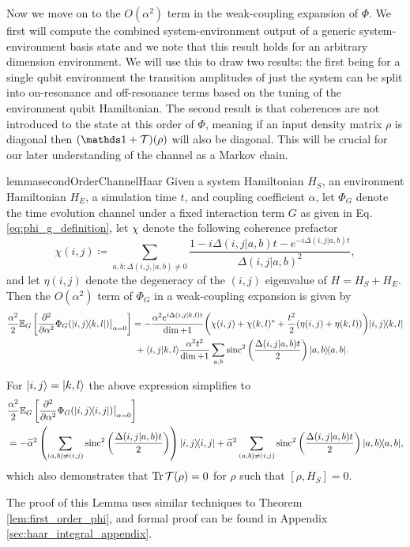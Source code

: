 Now we move on to the $O(\alpha^2)$ term in the weak-coupling expansion of $\Phi$. We first will compute the combined system-environment output of a generic system-environment basis state and we note that this result holds for an arbitrary dimension environment. We will use this to draw two results:  the first being for a single qubit environment the transition amplitudes of just the system can be split into on-resonance and off-resonance terms based on the tuning of the environment qubit Hamiltonian. The second result is that coherences are not introduced to the state at this order of $\Phi$, meaning if an input density matrix $\rho$ is diagonal then $(\identity + \mathcal{T})(\rho)$ will also be diagonal. This will be crucial for our later understanding of the channel as a Markov chain.
\begin{restatable}{lemma}{secondOrderChannelHaar} \label{lem:big_one}
    Given a system Hamiltonian $H_{S}$, an environment Hamiltonian $H_{E}$, a simulation time $t$, and coupling coefficient $\alpha$, let $\Phi_G$ denote the time evolution channel under a fixed interaction term $G$ as given in Eq. \eqref{eq:phi_g_definition}, let $\chi$ denote the following coherence prefactor
$$ \chi(i,j) \coloneqq \sum_{a,b: \Delta(i,j,|a,b) \neq 0} \frac{1 - i \Delta(i,j|a,b)t - e^{-i \Delta(i,j|a,b) t}}{\Delta(i,j|a,b)^2}, $$
and let $\eta(i,j)$ denote the degeneracy of the $(i,j)$ eigenvalue of $H = H_S + H_E$. Then the $O(\alpha^2)$ term of $\Phi_G$ in a weak-coupling expansion is given by
 \begin{align}
 \frac{\alpha^2}{2} \mathbb{E}_G \left[ \frac{\partial^2}{\partial \alpha^2} \Phi_G(| i,j\rangle\! \langle k,l|) \big|_{\alpha = 0} \right] &= -\frac{\alpha^2  e^{i \Delta(i,j|k,l) t}}{\dim + 1} \bigg(\chi(i,j) + \chi(k,l)^*  + \frac{t^2}{2}(\eta(i,j) + \eta(k,l)) \bigg) | i,j\rangle\! \langle k,l| \nonumber \\
    &~ + \langle i,j|k,l\rangle  \frac{\alpha^2 t^2}{\dim+1} \sum_{a,b} \operatorname{sinc}^2 \left( \frac{\Delta(i,j|a,b)t}{2} \right) | a,b\rangle\! \langle a,b|.  \label{eq:el_gigante}
 \end{align}

 For $|i, j\rangle = |k, l\rangle$ the above expression simplifies to
 \begin{align}
     &\frac{\alpha^2}{2} \mathbb{E}_G \left[ \frac{\partial^2}{\partial \alpha^2} \Phi_G(| i,j\rangle\! \langle i,j|) \big|_{\alpha = 0} \right] \nonumber \\
     &=  - \widetilde{\alpha}^2 \left(\sum_{(a,b) \neq (i,j)} \operatorname{sinc}^2 \left(\frac{\Delta(i,j | a,b)t}{2} \right) \right) | i, j\rangle\! \langle i,j| + \widetilde{\alpha}^2 \sum_{(a,b) \neq (i,j)} \operatorname{sinc}^2 \left(\frac{\Delta(i,j | a,b)t}{2} \right) | a, b\rangle\! \langle a,b| ,\label{eq:el_gigante_dos}
 \end{align}
 which also demonstrates that $\operatorname{Tr} \mathcal{T}(\rho) = 0$ for $\rho$ such that $[\rho, H_S] = 0$.
\end{restatable}
\noindent The proof of this Lemma uses similar techniques to Theorem \ref{lem:first_order_phi}, and formal proof can be found in Appendix \ref{sec:haar_integral_appendix}.

